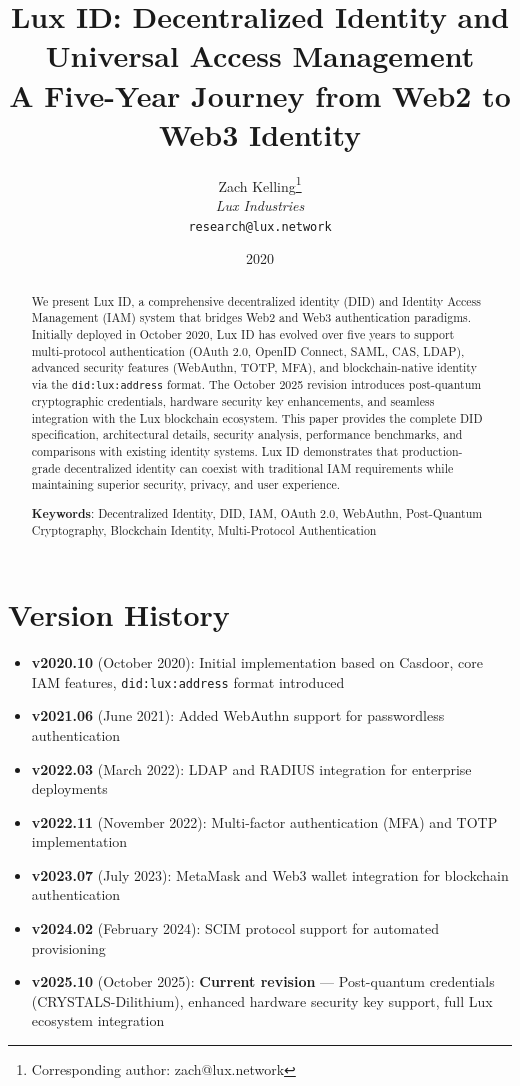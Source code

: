\documentclass[11pt,a4paper]{article}
\title{
  \textbf{Lux ID: Decentralized Identity and Universal Access Management} \\
  \large A Five-Year Journey from Web2 to Web3 Identity
}
\author{
Zach Kelling\thanks{Corresponding author: zach@lux.network}\\
\textit{Lux Industries}\\
\texttt{research@lux.network}
}
\date{2020}
\begin{document}
\luxcoverpage
\maketitle

\begin{abstract}
We present Lux ID, a comprehensive decentralized identity (DID) and Identity Access Management (IAM) system that bridges Web2 and Web3 authentication paradigms. Initially deployed in October 2020, Lux ID has evolved over five years to support multi-protocol authentication (OAuth 2.0, OpenID Connect, SAML, CAS, LDAP), advanced security features (WebAuthn, TOTP, MFA), and blockchain-native identity via the \texttt{did:lux:address} format. The October 2025 revision introduces post-quantum cryptographic credentials, hardware security key enhancements, and seamless integration with the Lux blockchain ecosystem. This paper provides the complete DID specification, architectural details, security analysis, performance benchmarks, and comparisons with existing identity systems. Lux ID demonstrates that production-grade decentralized identity can coexist with traditional IAM requirements while maintaining superior security, privacy, and user experience.

\textbf{Keywords}: Decentralized Identity, DID, IAM, OAuth 2.0, WebAuthn, Post-Quantum Cryptography, Blockchain Identity, Multi-Protocol Authentication
\end{abstract}

\section*{Version History}

\begin{itemize}[leftmargin=*]
  \item \textbf{v2020.10} (October 2020): Initial implementation based on Casdoor, core IAM features, \texttt{did:lux:address} format introduced
  \item \textbf{v2021.06} (June 2021): Added WebAuthn support for passwordless authentication
  \item \textbf{v2022.03} (March 2022): LDAP and RADIUS integration for enterprise deployments
  \item \textbf{v2022.11} (November 2022): Multi-factor authentication (MFA) and TOTP implementation
  \item \textbf{v2023.07} (July 2023): MetaMask and Web3 wallet integration for blockchain authentication
  \item \textbf{v2024.02} (February 2024): SCIM protocol support for automated provisioning
  \item \textbf{v2025.10} (October 2025): \textbf{Current revision} — Post-quantum credentials (CRYSTALS-Dilithium), enhanced hardware security key support, full Lux ecosystem integration
\end{itemize}
\end{document}
